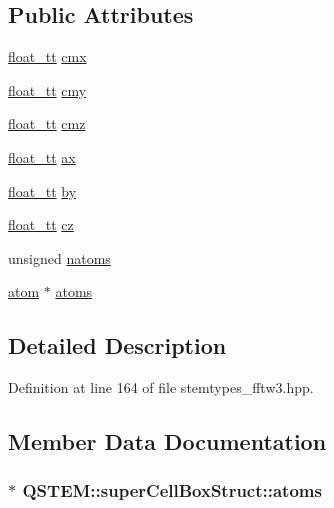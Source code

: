 \subsection*{Public Attributes}
\begin{DoxyCompactItemize}
\item 
\hyperlink{namespace_q_s_t_e_m_a915d7caa497280d9f927c4ce8d330e47}{float\-\_\-tt} \hyperlink{struct_q_s_t_e_m_1_1super_cell_box_struct_a7283d917affe9ca12b44165d123d0adc}{cmx}
\item 
\hyperlink{namespace_q_s_t_e_m_a915d7caa497280d9f927c4ce8d330e47}{float\-\_\-tt} \hyperlink{struct_q_s_t_e_m_1_1super_cell_box_struct_a3df31a41a8c8b613238bb2f0f64e4d37}{cmy}
\item 
\hyperlink{namespace_q_s_t_e_m_a915d7caa497280d9f927c4ce8d330e47}{float\-\_\-tt} \hyperlink{struct_q_s_t_e_m_1_1super_cell_box_struct_a71acd27a7682ad5d7c8325bb158435a6}{cmz}
\item 
\hyperlink{namespace_q_s_t_e_m_a915d7caa497280d9f927c4ce8d330e47}{float\-\_\-tt} \hyperlink{struct_q_s_t_e_m_1_1super_cell_box_struct_ad00456cbe7910328d77839bb627d1961}{ax}
\item 
\hyperlink{namespace_q_s_t_e_m_a915d7caa497280d9f927c4ce8d330e47}{float\-\_\-tt} \hyperlink{struct_q_s_t_e_m_1_1super_cell_box_struct_a8853212df9c98c7c521272b63775cf6f}{by}
\item 
\hyperlink{namespace_q_s_t_e_m_a915d7caa497280d9f927c4ce8d330e47}{float\-\_\-tt} \hyperlink{struct_q_s_t_e_m_1_1super_cell_box_struct_a53ae09de9dd9d799a53d149ac7512f34}{cz}
\item 
unsigned \hyperlink{struct_q_s_t_e_m_1_1super_cell_box_struct_a8137230f06157c71e74da82dcb7c121d}{natoms}
\item 
\hyperlink{namespace_q_s_t_e_m_a402dabc31a7a1fe906d0cdd138c69686}{atom} $\ast$ \hyperlink{struct_q_s_t_e_m_1_1super_cell_box_struct_ab070f5880452cd715cccc35783bf5c17}{atoms}
\end{DoxyCompactItemize}


\subsection{Detailed Description}


Definition at line 164 of file stemtypes\-\_\-fftw3.\-hpp.



\subsection{Member Data Documentation}
\hypertarget{struct_q_s_t_e_m_1_1super_cell_box_struct_ab070f5880452cd715cccc35783bf5c17}{
\subsubsection[{atoms}]{$\ast$ Q\-S\-T\-E\-M\-::super\-Cell\-Box\-Struct\-::atoms}}\label{struct_q_s_t_e_m_1_1super_cell_box_struct_ab070f5880452cd715cccc35783bf5c17}


